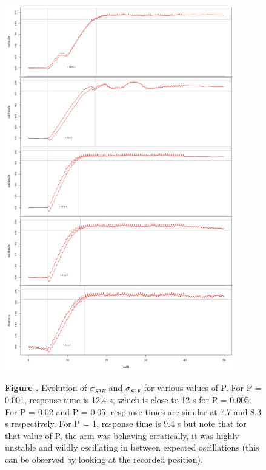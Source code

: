 \documentclass{report}
\begin{document}
\begin{figure}[h!]
\begin{center}
\includegraphics[width=10cm]{figures/varying_P-ss2.png}
\end{center}
 \textbf{\label{fig:05} Figure . }{Evolution of $\sigma_{S2E}$ and $\sigma_{S2F}$  for various values of P. For P = 0.001, response time is 12.4 s, which is close to 12 s for P = 0.005. For P = 0.02 and P = 0.05, response times are similar at 7.7 and 8.3 s respectively. For P = 1, response time is 9.4 s but note that for that value of P, the arm was behaving erratically, it was highly unstable and wildly oscillating in between expected oscillations (this can be observed by looking at the recorded position).}
\end{figure}
\end{document}
